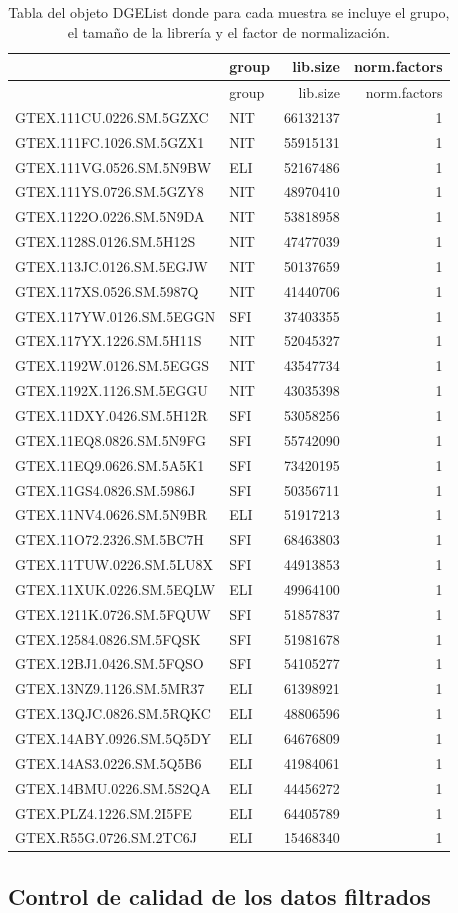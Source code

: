 \documentclass[]{article}
\begin{document}
\begin{longtable}[]{@{}llrr@{}}
\caption{Tabla del objeto DGEList donde para cada muestra se incluye el
grupo, el tamaño de la librería y el factor de
normalización.}\tabularnewline
\toprule
& group & lib.size & norm.factors\tabularnewline
\midrule
\endfirsthead
\toprule
& group & lib.size & norm.factors\tabularnewline
\midrule
\endhead
GTEX.111CU.0226.SM.5GZXC & NIT & 66132137 & 1\tabularnewline
GTEX.111FC.1026.SM.5GZX1 & NIT & 55915131 & 1\tabularnewline
GTEX.111VG.0526.SM.5N9BW & ELI & 52167486 & 1\tabularnewline
GTEX.111YS.0726.SM.5GZY8 & NIT & 48970410 & 1\tabularnewline
GTEX.1122O.0226.SM.5N9DA & NIT & 53818958 & 1\tabularnewline
GTEX.1128S.0126.SM.5H12S & NIT & 47477039 & 1\tabularnewline
GTEX.113JC.0126.SM.5EGJW & NIT & 50137659 & 1\tabularnewline
GTEX.117XS.0526.SM.5987Q & NIT & 41440706 & 1\tabularnewline
GTEX.117YW.0126.SM.5EGGN & SFI & 37403355 & 1\tabularnewline
GTEX.117YX.1226.SM.5H11S & NIT & 52045327 & 1\tabularnewline
GTEX.1192W.0126.SM.5EGGS & NIT & 43547734 & 1\tabularnewline
GTEX.1192X.1126.SM.5EGGU & NIT & 43035398 & 1\tabularnewline
GTEX.11DXY.0426.SM.5H12R & SFI & 53058256 & 1\tabularnewline
GTEX.11EQ8.0826.SM.5N9FG & SFI & 55742090 & 1\tabularnewline
GTEX.11EQ9.0626.SM.5A5K1 & SFI & 73420195 & 1\tabularnewline
GTEX.11GS4.0826.SM.5986J & SFI & 50356711 & 1\tabularnewline
GTEX.11NV4.0626.SM.5N9BR & ELI & 51917213 & 1\tabularnewline
GTEX.11O72.2326.SM.5BC7H & SFI & 68463803 & 1\tabularnewline
GTEX.11TUW.0226.SM.5LU8X & SFI & 44913853 & 1\tabularnewline
GTEX.11XUK.0226.SM.5EQLW & ELI & 49964100 & 1\tabularnewline
GTEX.1211K.0726.SM.5FQUW & SFI & 51857837 & 1\tabularnewline
GTEX.12584.0826.SM.5FQSK & SFI & 51981678 & 1\tabularnewline
GTEX.12BJ1.0426.SM.5FQSO & SFI & 54105277 & 1\tabularnewline
GTEX.13NZ9.1126.SM.5MR37 & ELI & 61398921 & 1\tabularnewline
GTEX.13QJC.0826.SM.5RQKC & ELI & 48806596 & 1\tabularnewline
GTEX.14ABY.0926.SM.5Q5DY & ELI & 64676809 & 1\tabularnewline
GTEX.14AS3.0226.SM.5Q5B6 & ELI & 41984061 & 1\tabularnewline
GTEX.14BMU.0226.SM.5S2QA & ELI & 44456272 & 1\tabularnewline
GTEX.PLZ4.1226.SM.2I5FE & ELI & 64405789 & 1\tabularnewline
GTEX.R55G.0726.SM.2TC6J & ELI & 15468340 & 1\tabularnewline
\bottomrule
\end{longtable}

\hypertarget{control-de-calidad-de-los-datos-filtrados}{%
\subsection{Control de calidad de los datos
filtrados}\label{control-de-calidad-de-los-datos-filtrados}}
\end{document}
